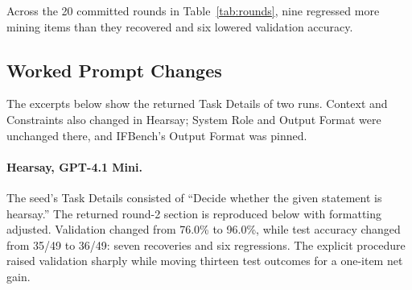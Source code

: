 \documentclass[11pt]{article}
\begin{document}
Across the 20 committed rounds in Table~\ref{tab:rounds}, nine regressed more mining items than they recovered and six
lowered validation accuracy.

\FloatBarrier
\subsection{Worked Prompt Changes}
\label{app:evolution}
The excerpts below show the returned Task Details of two runs. Context and Constraints also changed in Hearsay;
System Role and Output Format were unchanged there, and IFBench's Output Format was pinned.

\paragraph{Hearsay, GPT-4.1 Mini.}
The seed's Task Details consisted of ``Decide whether the given statement is hearsay.'' The returned round-2 section
is reproduced below with formatting adjusted. Validation changed from 76.0\% to 96.0\%, while test accuracy changed
from 35/49 to 36/49: seven recoveries and six regressions. The explicit procedure raised validation sharply while
moving thirteen test outcomes for a one-item net gain.
\end{document}
